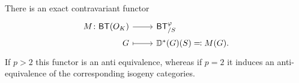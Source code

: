 \begin{prop}\label{prop:A6Kisin}
	There is an exact contravariant functor
	\begin{equation*}
	\begin{tikzcd}[row sep = 0ex
		,/tikz/column 1/.append style={anchor=base east}
		,/tikz/column 2/.append style={anchor=base west}]
		M\colon \mathsf{BT}(O_{ K }) \arrow[r, "", rightarrow] &
		\mathsf{BT}^{\varphi}_{/S} \\
		G \arrow[r, "", mapsto] & 
		\mathbb{D}^*(G)(S) \eqqcolon M(G)
	.\end{tikzcd}
	\end{equation*} 
	If $p > 2$ this functor is an anti equivalence,
	whereas if $p = 2$ it induces an anti-equivalence of the 
	corresponding isogeny categories.
\end{prop}
